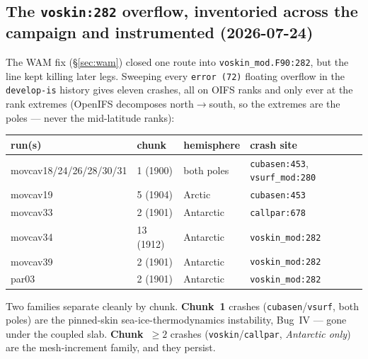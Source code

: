 \documentclass[11pt,a4paper]{article}
\newcommand{\code}[1]{\texttt{\small #1}}
\begin{document}
\subsection{The \code{voskin:282} overflow, inventoried across the campaign and instrumented (2026-07-24)}\label{sec:voskin-inventory}

The WAM fix (\S\ref{sec:wam}) closed one route into \code{voskin\_mod.F90:282}, but the line kept
killing later legs. Sweeping every \code{error (72)} floating overflow in the \code{develop-is}
history gives eleven crashes, all on OIFS ranks and only ever at the rank extremes (OpenIFS
decomposes north$\to$south, so the extremes are the poles --- never the mid-latitude ranks):

\begin{center}\small
\begin{tabular}{@{}llll@{}}
\toprule
run(s) & chunk & hemisphere & crash site \\
\midrule
movcav18/24/26/28/30/31 & 1 (1900) & both poles & \code{cubasen:453}, \code{vsurf\_mod:280} \\
movcav19                & 5 (1904) & Arctic     & \code{cubasen:453} \\
movcav33                & 2 (1901) & Antarctic  & \code{callpar:678} \\
movcav34                & 13 (1912)& Antarctic  & \code{voskin\_mod:282} \\
movcav39                & 2 (1901) & Antarctic  & \code{voskin\_mod:282} \\
par03                   & 2 (1901) & Antarctic  & \code{voskin\_mod:282} \\
\bottomrule
\end{tabular}
\end{center}

Two families separate cleanly by chunk. \textbf{Chunk~1} crashes (\code{cubasen}/\code{vsurf}, both
poles) are the pinned-skin sea-ice-thermodynamics instability, Bug~IV --- gone under the coupled
slab. \textbf{Chunk~$\ge2$} crashes (\code{voskin}/\code{callpar}, \emph{Antarctic only}) are the
mesh-increment family, and they persist.
\end{document}
